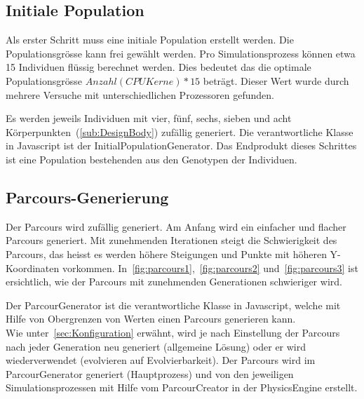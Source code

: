     \subsection{Initiale Population\label{sec:initPop}}

      Als erster Schritt muss eine initiale Population erstellt werden.
      Die Populationsgrösse kann frei gewählt werden.
      Pro Simulationsprozess können etwa 15 Individuen flüssig berechnet werden.
      Dies bedeutet das die optimale Populationsgrösse  \(Anzahl(CPU Kerne) * 15 \) beträgt.
      Dieser Wert wurde durch mehrere Versuche mit unterschiedlichen Prozessoren gefunden.

      \medskip

      Es werden jeweils Individuen mit vier, fünf, sechs, sieben und acht Körperpunkten~(\vref{sub:DesignBody}) zufällig generiert.
      Die verantwortliche Klasse in Javascript ist der InitialPopulationGenerator.
      Das Endprodukt dieses Schrittes ist eine Population bestehenden aus den Genotypen der Individuen.

    \subsection{Parcours-Generierung\label{sec:ParcourCreation}}

      Der Parcours wird zufällig generiert. Am Anfang wird ein einfacher und flacher Parcours generiert.
      Mit zunehmenden Iterationen steigt die Schwierigkeit des Parcours,
      das heisst es werden höhere Steigungen und Punkte mit höheren Y-Koordinaten vorkommen.
      In~\vref{fig:parcours1},~\vref{fig:parcours2} und~\vref{fig:parcours3} ist ersichtlich,
      wie der Parcours mit zunehmenden Generationen schwieriger wird.

      \medskip

      Der ParcourGenerator ist die verantwortliche Klasse in Javascript,
      welche mit Hilfe von Obergrenzen von Werten einen Parcours generieren kann.
      \\
      Wie unter~\vref{sec:Konfiguration} erwähnt,
      wird je nach Einstellung der Parcours nach jeder Generation neu generiert (allgemeine Lösung) oder
      er wird wiederverwendet (evolvieren auf Evolvierbarkeit).
      Der Parcours wird im ParcourGenerator generiert (Hauptprozess) und
      von den jeweiligen Simulationsprozessen mit Hilfe vom ParcourCreator in der \gls{PhysicsEngine} erstellt.

      \vspace{1cm}

